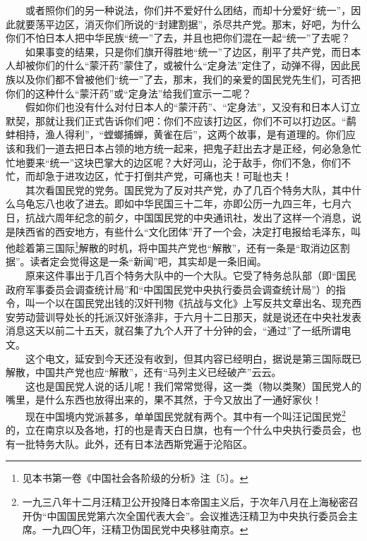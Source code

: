 \documentclass[cn,11pt,chinese]{elegantbook}
\begin{document}
　　或者照你们的另一种说法，你们并不爱好什么团结，而却十分爱好“统一”，因此就要荡平边区，消灭你们所说的“封建割据”，杀尽共产党。那末，好吧，为什么你们不怕日本人把中华民族“统一”了去，并且也把你们混在一起“统一”了去呢？\\
　　如果事变的结果，只是你们旗开得胜地“统一”了边区，削平了共产党，而日本人却被你们的什么“蒙汗药”蒙住了，或被什么“定身法”定住了，动弹不得，因此民族以及你们都不曾被他们“统一”了去，那末，我们的亲爱的国民党先生们，可否把你们的这种什么“蒙汗药”或“定身法”给我们宣示一二呢？\\
　　假如你们也没有什么对付日本人的“蒙汗药”、“定身法”，又没有和日本人订立默契，那就让我们正式告诉你们吧：你们不应该打边区，你们不可以打边区。“鹬蚌相持，渔人得利”，“螳螂捕蝉，黄雀在后”，这两个故事，是有道理的。你们应该和我们一道去把日本占领的地方统一起来，把鬼子赶出去才是正经，何必急急忙忙地要来“统一”这块巴掌大的边区呢？大好河山，沦于敌手，你们不急，你们不忙，而却急于进攻边区，忙于打倒共产党，可痛也夫！可耻也夫！\\
　　其次看国民党的党务。国民党为了反对共产党，办了几百个特务大队，其中什么乌龟忘八也收了进去。即如中华民国三十二年，亦即公历一九四三年，七月六日，抗战六周年纪念的前夕，中国国民党的中央通讯社，发出了这样一个消息，说是陕西省的西安地方，有些什么“文化团体”开了一个会，决定打电报给毛泽东，叫他趁着第三国际\footnote[1]{ 见本书第一卷《中国社会各阶级的分析》注〔5〕。}解散的时机，将中国共产党也“解散”，还有一条是“取消边区割据”。读者定会觉得这是一条“新闻”吧，其实却是一条旧闻。\\
　　原来这件事出于几百个特务大队中的一个大队。它受了特务总队部（即“国民政府军事委员会调查统计局”和“中国国民党中央执行委员会调查统计局”）的指令，叫一个以在国民党出钱的汉奸刊物《抗战与文化》上写反共文章出名、现充西安劳动营训导处长的托派汉奸张涤非，于六月十二日那天，就是说还在中央社发表消息这天以前二十五天，就召集了九个人开了十分钟的会，“通过”了一纸所谓电文。\\
　　这个电文，延安到今天还没有收到，但其内容已经明白，据说是第三国际既已解散，中国共产党也应“解散”，还有“马列主义已经破产”云云。\\
　　这也是国民党人说的话儿呢！我们常常觉得，这一类（物以类聚）国民党人的嘴里，是什么东西也放得出来的，果不其然，于今又放出了一通好家伙！\\
　　现在中国境内党派甚多，单单国民党就有两个。其中有一个叫汪记国民党\footnote[2]{ 一九三八年十二月汪精卫公开投降日本帝国主义后，于次年八月在上海秘密召开伪“中国国民党第六次全国代表大会”。会议推选汪精卫为中央执行委员会主席。一九四〇年，汪精卫伪国民党中央移驻南京。}的，立在南京以及各地，打的也是青天白日旗，也有一个什么中央执行委员会，也有一批特务大队。此外，还有日本法西斯党遍于沦陷区。\\
\end{document}
